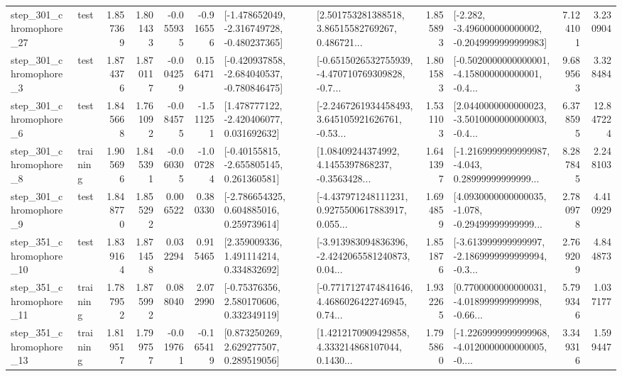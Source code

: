 \begin{tabular}{llrrrrllrlrr}
  step\_301\_chromophore\_27 &      test &      1.857369 &    1.801433 &     -0.055935 & -0.916556 &  [-1.478652049, -2.316749728, -0.480237365] &  [2.501753281388518, 3.86515582769267, 0.486721... &       1.855893 &  [-2.282, -3.496000000000002, -0.2049999999999983] &            7.124101 &          3.230904 \\
   step\_301\_chromophore\_3 &      test &      1.874376 &    1.870117 &     -0.004259 &  0.156471 &  [-0.420937858, -2.684040537, -0.780846475] &  [-0.6515026532755939, -4.470710769309828, -0.7... &       1.801583 &  [-0.5020000000000001, -4.158000000000001, -0.4... &            9.689563 &          3.328484 \\
   step\_301\_chromophore\_6 &      test &      1.845668 &    1.761092 &     -0.084575 & -1.511251 &    [1.478777122, -2.420406077, 0.031692632] &  [-2.2467261934458493, 3.645105921626761, -0.53... &       1.531103 &  [2.0440000000000023, -3.5010000000000003, -0.4... &            6.378595 &         12.847224 \\
   step\_301\_chromophore\_8 &  training &      1.905696 &    1.845391 &     -0.060305 & -1.007284 &    [-0.40155815, -2.655805145, 0.261360581] &  [1.08409244374992, 4.1455397868237, -0.3563428... &       1.641397 &  [-1.2169999999999987, -4.043, 0.28999999999999... &            8.287845 &          2.248103 \\
   step\_301\_chromophore\_9 &      test &      1.848770 &    1.855292 &      0.006522 &  0.380330 &    [-2.786654325, 0.604885016, 0.259739614] &  [-4.437971248111231, 0.9275500617883917, 0.055... &       1.694859 &  [4.0930000000000035, -1.078, -0.29499999999999... &            2.780978 &          4.410929 \\
  step\_351\_chromophore\_10 &      test &      1.839164 &    1.871458 &      0.032294 &  0.915465 &     [2.359009336, 1.491114214, 0.334832692] &  [-3.913983094836396, -2.4242065581240873, 0.04... &       1.851876 &  [-3.613999999999997, -2.1869999999999994, -0.3... &            2.769209 &          4.844873 \\
  step\_351\_chromophore\_11 &  training &      1.787952 &    1.875992 &      0.088040 &  2.072990 &     [-0.75376356, 2.580170606, 0.332349119] &  [-0.7717127474841646, 4.4686026422746945, 0.74... &       1.932265 &  [0.7700000000000031, -4.018999999999998, -0.66... &            5.799346 &          1.037177 \\
  step\_351\_chromophore\_13 &  training &      1.819517 &    1.799757 &     -0.019761 & -0.165419 &     [0.873250269, 2.629277507, 0.289519056] &  [1.4212170909429858, 4.333214868107044, 0.1430... &       1.795860 &  [-1.2269999999999968, -4.0120000000000005, -0.... &            3.349316 &          1.599447 \\

\end{tabular}
